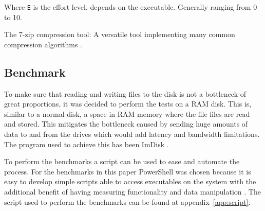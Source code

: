 \documentclass[11pt,a4paper]{report}
\begin{document}
Where \verb|E| is the effort level, depends on the executable. Generally ranging from 0 to 10.

The 7-zip compression tool: A versatile tool implementing many common compression algorithms \cite{7zip}.

%
%
%
%
%
%
%
%
%
%
%

\subsection{Benchmark}

To make sure that reading and writing files to the disk is not a bottleneck of great proportions, it was decided to perform the tests on a RAM disk. This is, similar to a normal disk, a space in RAM memory where the file files are read and stored. This mitigates the bottleneck caused by sending huge amounts of data to and from the drives which would add latency and bandwidth limitations. The program used to achieve this has been ImDisk \cite{imdisk}.

To perform the benchmarks a script can be used to ease and automate the process. For the benchmarks in this paper PowerShell was chosen because it is easy to develop simple scripts able to access executables on the system with the additional benefit of having measuring functionality and data manipulation \cite{ps}. The script used to perform the benchmarks can be found at appendix~\ref{app:script}.
\end{document}
